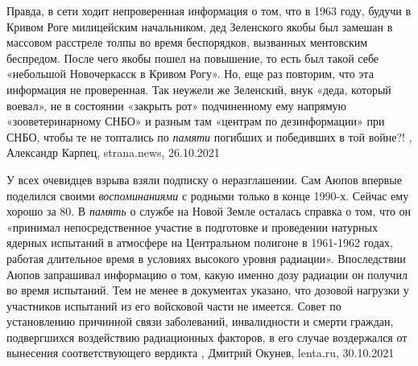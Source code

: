 Правда, в сети ходит непроверенная информация о том, что в 1963 году, будучи в
Кривом Роге милицейским начальником, дед Зеленского якобы был замешан в
массовом расстреле толпы во время беспорядков, вызванных ментовским беспредом.
После чего якобы пошел на повышение, то есть был такой себе «небольшой
Новочеркасск в Кривом Рогу». Но, еще раз повторим, что эта информация не
проверенная.  Так неужели же Зеленский, внук «деда, который воевал», не в
состоянии «закрыть рот» подчиненному ему напрямую «зооветеринарному СНБО» и
разным там «центрам по дезинформации» при СНБО, чтобы те не топтались по \emph{памяти}
погибших и победивших в той войне?!
, 
Александр Карпец, strana.news, 26.10.2021

У всех очевидцев взрыва взяли подписку о неразглашении. Сам Аюпов впервые
поделился своими \emph{воспоминаниями} с родными только в конце 1990-х. Сейчас ему
хорошо за 80. В \emph{память} о службе на Новой Земле осталась справка о том, что он
«принимал непосредственное участие в подготовке и проведении натурных ядерных
испытаний в атмосфере на Центральном полигоне в 1961-1962 годах, работая
длительное время в условиях высокого уровня радиации».
Впоследствии Аюпов запрашивал информацию о том, какую именно дозу радиации он
получил во время испытаний. Тем не менее в документах указано, что дозовой
нагрузки у участников испытаний из его войсковой части не имеется. Совет по
установлению причинной связи заболеваний, инвалидности и смерти граждан,
подвергшихся воздействию радиационных факторов, в его случае воздержался от
вынесения соответствующего вердикта
, Дмитрий Окунев, lenta.ru, 30.10.2021
